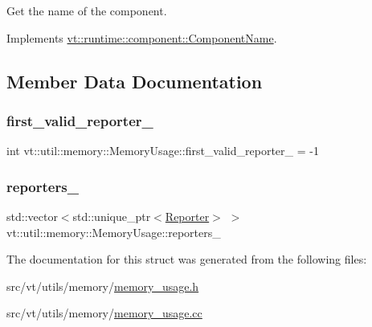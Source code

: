 Get the name of the component. 



Implements \hyperlink{structvt_1_1runtime_1_1component_1_1_component_name_a33c06229bb605a2b2ceff68830d6d773}{vt\+::runtime\+::component\+::\+Component\+Name}.



\subsection{Member Data Documentation}
\mbox{\label{structvt_1_1util_1_1memory_1_1_memory_usage_a714d3de79740091fce1761c7c0a858bd}} 
\subsubsection{\texorpdfstring{first\+\_\+valid\+\_\+reporter\+\_\+}{first\_valid\_reporter\_}}
{\footnotesize\ttfamily int vt\+::util\+::memory\+::\+Memory\+Usage\+::first\+\_\+valid\+\_\+reporter\+\_\+ = -\/1\hspace{0.3cm}{\ttfamily [private]}}

\mbox{\label{structvt_1_1util_1_1memory_1_1_memory_usage_afe2db27e57d4fb6f0356c06a376cd568}} 
\subsubsection{\texorpdfstring{reporters\+\_\+}{reporters\_}}
{\footnotesize\ttfamily std\+::vector$<$std\+::unique\+\_\+ptr$<$\hyperlink{structvt_1_1util_1_1memory_1_1_reporter}{Reporter}$>$ $>$ vt\+::util\+::memory\+::\+Memory\+Usage\+::reporters\+\_\+\hspace{0.3cm}{\ttfamily [private]}}



The documentation for this struct was generated from the following files\+:\begin{DoxyCompactItemize}
\item 
src/vt/utils/memory/\hyperlink{memory__usage_8h}{memory\+\_\+usage.\+h}\item 
src/vt/utils/memory/\hyperlink{memory__usage_8cc}{memory\+\_\+usage.\+cc}\end{DoxyCompactItemize}
